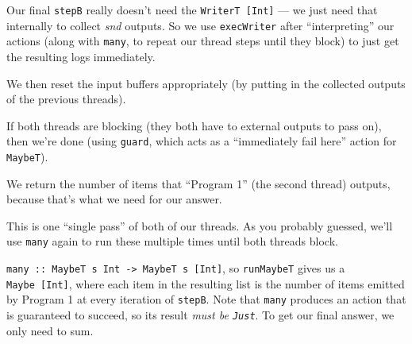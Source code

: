 \documentclass[]{article}
\newenvironment{Shaded}{}{}
\newcommand{\CharTok}[1]{\textcolor[rgb]{0.25,0.44,0.63}{#1}}
\newcommand{\CommentTok}[1]{\textcolor[rgb]{0.38,0.63,0.69}{\textit{#1}}}
\newcommand{\DataTypeTok}[1]{\textcolor[rgb]{0.56,0.13,0.00}{#1}}
\newcommand{\DecValTok}[1]{\textcolor[rgb]{0.25,0.63,0.44}{#1}}
\newcommand{\FunctionTok}[1]{\textcolor[rgb]{0.02,0.16,0.49}{#1}}
\newcommand{\KeywordTok}[1]{\textcolor[rgb]{0.00,0.44,0.13}{\textbf{#1}}}
\newcommand{\NormalTok}[1]{#1}
\newcommand{\OperatorTok}[1]{\textcolor[rgb]{0.40,0.40,0.40}{#1}}
\newcommand{\OtherTok}[1]{\textcolor[rgb]{0.00,0.44,0.13}{#1}}
\newcommand{\StringTok}[1]{\textcolor[rgb]{0.25,0.44,0.63}{#1}}
\begin{document}
Our final \texttt{stepB} really doesn't need the \texttt{WriterT\ {[}Int{]}} ---
we just need that internally to collect \emph{snd} outputs. So we use
\texttt{execWriter} after ``interpreting'' our actions (along with
\texttt{many}, to repeat our thread steps until they block) to just get the
resulting logs immediately.

We then reset the input buffers appropriately (by putting in the collected
outputs of the previous threads).

If both threads are blocking (they both have to external outputs to pass on),
then we're done (using \texttt{guard}, which acts as a ``immediately fail here''
action for \texttt{MaybeT}).

We return the number of items that ``Program 1'' (the second thread) outputs,
because that's what we need for our answer.

This is one ``single pass'' of both of our threads. As you probably guessed,
we'll use \texttt{many} again to run these multiple times until both threads
block.

\begin{Shaded}
\end{Shaded}

\texttt{many\ ::\ MaybeT\ s\ Int\ -\textgreater{}\ MaybeT\ s\ {[}Int{]}}, so
\texttt{runMaybeT} gives us a \texttt{Maybe\ {[}Int{]}}, where each item in the
resulting list is the number of items emitted by Program 1 at every iteration of
\texttt{stepB}. Note that \texttt{many} produces an action that is guaranteed to
succeed, so its result \emph{must be \texttt{Just}}. To get our final answer, we
only need to sum.
\end{document}

